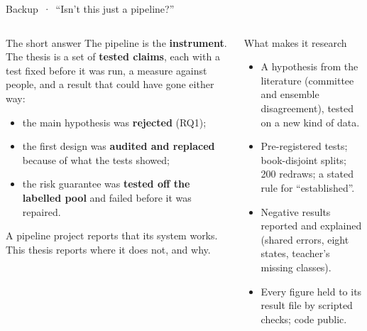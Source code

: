 \documentclass[aspectratio=169,10pt]{beamer}
\begin{document}
\begin{frame}{Backup \,·\, ``Isn't this just a pipeline?''}
\begin{columns}[T,onlytextwidth]
\begin{defbox}{The short answer}
The pipeline is the \textbf{instrument}. The thesis is a set of \textbf{tested claims}, each with a test fixed before it was run, a measure against people, and a result that could have gone either way:
\begin{itemize}\setlength\itemsep{1pt}
\item the main hypothesis was \textbf{rejected} (RQ1);
\item the first design was \textbf{audited and replaced} because of what the tests showed;
\item the risk guarantee was \textbf{tested off the labelled pool} and failed before it was repaired.
\end{itemize}
A pipeline project reports that its system works. This thesis reports where it does not, and why.
\end{defbox}
\begin{defbox}{What makes it research}
\begin{itemize}\setlength\itemsep{2pt}
\item A hypothesis from the literature (committee and ensemble disagreement), tested on a new kind of data.
\item Pre-registered tests; book-disjoint splits; 200 redraws; a stated rule for ``established''.
\item Negative results reported and explained (shared errors, eight states, teacher's missing classes).
\item Every figure held to its result file by scripted checks; code public.
\end{itemize}
\end{defbox}
\end{columns}
\end{frame}
\end{document}
